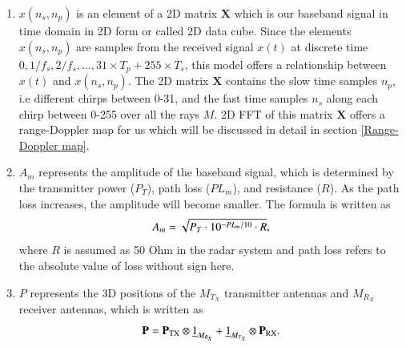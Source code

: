 \documentclass[12pt,DIV14,BCOR12mm,a4paper,footinclude=false,headinclude,parskip=half-,twoside,openright,cleardoublepage=empty,toc=index,bibliography=totoc,listof=totoc]{scrreprt}
\numberwithin{equation}{chapter}
\begin{document}
\begin{enumerate}[label=\textbullet]

    \item $x(n_s, n_p)$ is an element of a 2D matrix $\mathbf{X}$ which is our baseband signal in time domain in 2D form or called 2D data cube. Since the elements $x(n_s, n_p)$ are samples from the received signal $x(t)$ at discrete time $0, 1/f_s, 2/f_s, ..., 31 \times T_p+255 \times T_s$, this model offers a relationship between $x(t)$ and $x(n_s, n_p)$. The 2D matrix $\mathbf{X}$ contains the slow time samples $n_p$, i.e different chirps between 0-31, and the fast time samples $n_s$ along each chirp between 0-255 over all the rays $M$. 2D FFT of this matrix $\mathbf{X}$ offers a range-Doppler map for us which will be discussed in detail in section \ref{Range-Doppler map}.
    
    \item $A_m$ represents the amplitude of the baseband signal, which is determined by the transmitter power ($P_T$), path loss ($PL_m$), and resistance ($R$). As the path loss increases, the amplitude will become smaller. The formula is written as
        \begin{equation}
            \centering
            A_m = \sqrt{P_T \cdot 10^{-PL_m / 10} \cdot R},
        \end{equation}
        where $R$ is assumed as 50 Ohm in the radar system and path loss refers to the absolute value of loss without sign here.

    \item $P$ represents the 3D positions of the $M_{T_{X}}$ transmitter antennas and $M_{R_{X}}$ receiver antennas, which is written as
        \begin{equation}
            \centering
            \mathbf{P} = \mathbf{P}_{\text{TX}} \otimes \underline{1}_{M_{R_{X}}} + \underline{1}_{M_{T_{X}}} \otimes \mathbf{P}_{\text{RX}}.
        \end{equation}


\end{enumerate}
\end{document}
